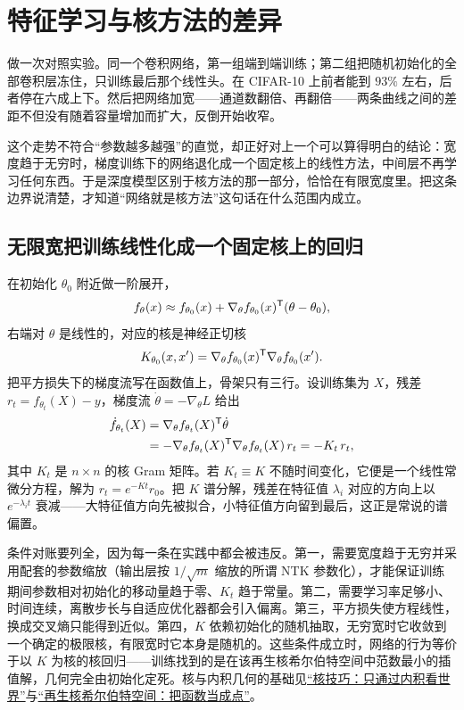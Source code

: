 \section{特征学习与核方法的差异}
\label{sec:14-Deep-Learning/10-Interpretability-Mathematics/02}

做一次对照实验。同一个卷积网络，第一组端到端训练；第二组把随机初始化的全部卷积层冻住，只训练最后那个线性头。在 CIFAR-10 上前者能到 \(93\%\) 左右，后者停在六成上下。然后把网络加宽——通道数翻倍、再翻倍——两条曲线之间的差距不但没有随着容量增加而扩大，反倒开始收窄。

这个走势不符合``参数越多越强''的直觉，却正好对上一个可以算得明白的结论：宽度趋于无穷时，梯度训练下的网络退化成一个固定核上的线性方法，中间层不再学习任何东西。于是深度模型区别于核方法的那一部分，恰恰在有限宽度里。把这条边界说清楚，才知道``网络就是核方法''这句话在什么范围内成立。

\subsection{无限宽把训练线性化成一个固定核上的回归}

在初始化 \(\theta_0\) 附近做一阶展开，
\[
f_\theta(x)\approx f_{\theta_0}(x)+\nabla_\theta f_{\theta_0}(x)^{\mathsf{T}}(\theta-\theta_0),
\]
右端对 \(\theta\) 是线性的，对应的核是神经正切核
\[
K_{\theta_0}(x,x')=\nabla_\theta f_{\theta_0}(x)^{\mathsf{T}}\nabla_\theta f_{\theta_0}(x').
\]
把平方损失下的梯度流写在函数值上，骨架只有三行。设训练集为 \(X\)，残差 \(r_t=f_{\theta_t}(X)-y\)，梯度流 \(\dot\theta=-\nabla_\theta L\) 给出
\[
\begin{aligned}
\dot f_{\theta_t}(X)&=\nabla_\theta f_{\theta_t}(X)^{\mathsf{T}}\dot\theta\\
&=-\nabla_\theta f_{\theta_t}(X)^{\mathsf{T}}\nabla_\theta f_{\theta_t}(X)\,r_t
=-K_t\,r_t,
\end{aligned}
\]
其中 \(K_t\) 是 \(n\times n\) 的核 Gram 矩阵。若 \(K_t\equiv K\) 不随时间变化，它便是一个线性常微分方程，解为 \(r_t=e^{-Kt}r_0\)。把 \(K\) 谱分解，残差在特征值 \(\lambda_i\) 对应的方向上以 \(e^{-\lambda_i t}\) 衰减——大特征值方向先被拟合，小特征值方向留到最后，这正是常说的谱偏置。

条件对账要列全，因为每一条在实践中都会被违反。第一，需要宽度趋于无穷并采用配套的参数缩放（输出层按 \(1/\sqrt{m}\) 缩放的所谓 NTK 参数化），才能保证训练期间参数相对初始化的移动量趋于零、\(K_t\) 趋于常量。第二，需要学习率足够小、时间连续，离散步长与自适应优化器都会引入偏离。第三，平方损失使方程线性，换成交叉熵只能得到近似。第四，\(K\) 依赖初始化的随机抽取，无穷宽时它收敛到一个确定的极限核，有限宽时它本身是随机的。这些条件成立时，网络的行为等价于以 \(K\) 为核的核回归——训练找到的是在该再生核希尔伯特空间中范数最小的插值解，几何完全由初始化定死。核与内积几何的基础见\hyperref[sec:13-Machine-Learning/09-Kernel-Methods-and-Gaussian-Processes/02]{``核技巧：只通过内积看世界''}与\hyperref[sec:13-Machine-Learning/09-Kernel-Methods-and-Gaussian-Processes/03]{``再生核希尔伯特空间：把函数当成点''}。

